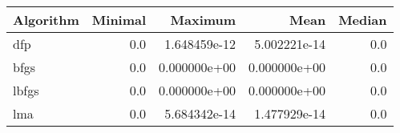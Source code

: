 \begin{tabular}{lrrrr}
\toprule
Algorithm &  Minimal &      Maximum &         Mean &  Median \\
\midrule
      dfp &      0.0 & 1.648459e-12 & 5.002221e-14 &     0.0 \\
     bfgs &      0.0 & 0.000000e+00 & 0.000000e+00 &     0.0 \\
    lbfgs &      0.0 & 0.000000e+00 & 0.000000e+00 &     0.0 \\
      lma &      0.0 & 5.684342e-14 & 1.477929e-14 &     0.0 \\
\bottomrule
\end{tabular}
